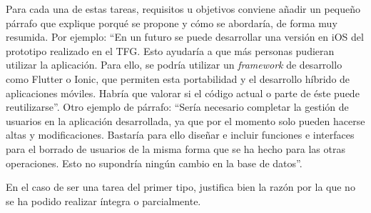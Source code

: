  Para cada una de estas tareas, requisitos u objetivos conviene añadir un pequeño párrafo que explique porqué se propone y cómo se abordaría, de forma muy resumida. Por ejemplo: ``En un futuro se puede desarrollar una versión en iOS del prototipo realizado en el TFG. Esto ayudaría a que más personas pudieran utilizar la aplicación. Para ello, se podría utilizar un \textit{framework} de desarrollo como Flutter o Ionic, que permiten esta portabilidad y el desarrollo híbrido de aplicaciones móviles. Habría que valorar si el código actual o parte de éste puede reutilizarse''. Otro ejemplo de párrafo: ``Sería necesario completar la gestión de usuarios en la aplicación desarrollada, ya que por el momento solo pueden hacerse altas y modificaciones. Bastaría para ello diseñar e incluir funciones e interfaces para el borrado de usuarios de la misma forma que se ha hecho para las otras operaciones. Esto no supondría ningún cambio en la base de datos''. 

 En el caso de ser una tarea del primer tipo, justifica bien la razón por la que no se ha podido realizar íntegra o parcialmente. 

 

 
